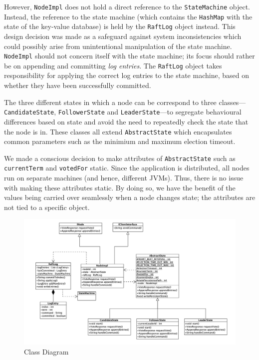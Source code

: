 \documentclass[12pt, a4paper]{article}
\begin{document}
However, \texttt{NodeImpl} does not hold a direct reference to the \texttt{StateMachine} object. Instead, the reference to the state machine (which contains the \texttt{HashMap} with the state of the key-value database) is held by the \texttt{RaftLog} object instead. This design decision was made as a safeguard against system inconsistencies which could possibly arise from unintentional manipulation of the state machine. \texttt{NodeImpl} should not concern itself with the state machine; its focus should rather be on appending and committing \textit{log entries}. The \texttt{RaftLog} object takes responsibility for applying the correct log entries to the state machine, based on whether they have been successfully committed.

The three different states in which a node can be correspond to three classes---\texttt{CandidateState}, \texttt{FollowerState} and \texttt{LeaderState}---to segregate behavioural differences based on state and avoid the need to repeatedly check the state that the node is in. These classes all extend \texttt{AbstractState} which encapsulates common parameters such as the minimium and maximum election timeout.

We made a conscious decision to make attributes of \texttt{AbstractState} such as \texttt{currentTerm} and \texttt{votedFor} static. Since the application is distributed, all nodes run on separate machines (and hence, different JVMs). Thus, there is no issue with making these attributes static. By doing so, we have the benefit of the values being carried over seamlessly when a node changes state; the attributes are not tied to a specific object.

\begin{figure}[htp]
  \centering
  \includegraphics[width=1\textwidth]{img/class-diragram.png}
  \caption{Class Diagram}
  \label{fig:uml}
\end{figure}
\end{document}
